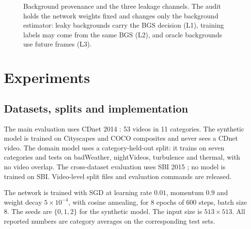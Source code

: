 \documentclass[sn-mathphys-num,iicol]{sn-jnl}
\begin{document}
\begin{figure}[t]
\centering
{}
\caption{Background provenance and the three leakage channels. The audit holds
the network weights fixed and changes only the background estimator: leaky
backgrounds carry the BGS decision (L1), training labels may come from the same
BGS (L2), and oracle backgrounds use future frames (L3).}
\label{fig:provenance}
\end{figure}

\section{Experiments}\label{sec:exp}

\subsection{Datasets, splits and implementation}\label{sec:setup}

The main evaluation uses CDnet 2014 \cite{cdnet2014}: 53 videos in 11 categories.
The synthetic model is trained on Cityscapes and COCO composites and never sees a
CDnet video. The domain model uses a category-held-out split: it trains on seven
categories and tests on badWeather, nightVideos, turbulence and thermal, with no
video overlap. The cross-dataset evaluation uses SBI 2015 \cite{sbi2015,sbitax2017}; no model
is trained on SBI. Video-level split files and evaluation commands are released.

The network is trained with SGD at learning rate $0.01$, momentum $0.9$ and weight
decay $5\times10^{-4}$, with cosine annealing, for 8 epochs of 600 steps, batch
size 8. The seeds are $\{0,1,2\}$ for the synthetic model. The input size is
$513\times513$. All reported numbers are category averages on the corresponding
test sets.
\end{document}
